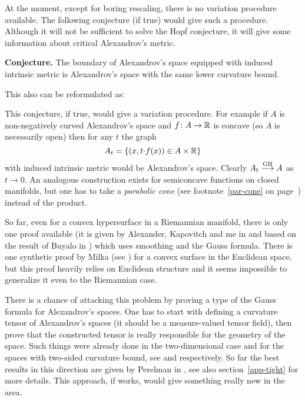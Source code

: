\documentclass{article}
\begin{document}
At the moment, except for boring rescaling, there is no variation procedure available.
The following conjecture (if true) would give such a procedure.
Although it will not be sufficient to solve the Hopf conjecture, it will give some information about critical Alexandrov's metric.

\begin{thm}{\bf Conjecture.}\label{conj:bry}
The boundary of Alexandrov's space equipped with induced intrinsic metric is Alexandrov's space with the same lower curvature bound.
\end{thm}

This also can be reformulated as:

\bigskip


\bigskip

This conjecture, if true, would give a variation procedure. 
For example if $A$ is non-negatively curved Alexandrov's space and $f\colon A\to\mathbb{R}$ is concave (so $A$ is necessarily open) then for any $t$ the graph
$$A_t
=
\{(x,t{\cdot} f(x))\in A\times\mathbb{R}\}$$
with induced intrinsic metric would be Alexandrov's space. 
Clearly $A_t\GHto A$ as $t\to0$. 
An analogous construction exists for semiconcave functions on closed manifolds, but
one has to take a \emph{parabolic cone} 
(see footnote~\ref{par-cone} on page~\pageref{par-cone}) 
instead of the product.


So far, even for a convex hypersurface in a Riemannian manifold, there is only one proof available (it is given by Alexander, Kapovitch and me in \cite{akp} 
and based on the result of Buyalo in \cite{buyalo:convex-surface}) 
which uses smoothing and the Gauss formula. 
There is one synthetic proof by Milka
(see \cite{milka-conv}) for a convex surface in the Euclidean space, but this proof heavily relies on Euclidean
structure and it seems impossible to generalize it even to the Riemannian case.

There is a chance of attacking this problem by proving a type of the Gauss formula for
Alexandrov's spaces. 
One has to start with defining a curvature tensor of Alexandrov's spaces (it
should be a measure-valued tensor field), then prove that the constructed tensor is really responsible for the geometry of the space. 
Such things were already done in the two-dimensional case
and for the spaces with two-sided curvature bound,
see \cite{reshetnyak:curvature} and
\cite{nikolaev:curvature} respectively.
So far the best results in this direction are given by Perelman in \cite{perelman:DC}, see also section~\ref{app-tight} for more details.
This approach, if works, would give something really new in the area.
\end{document}
